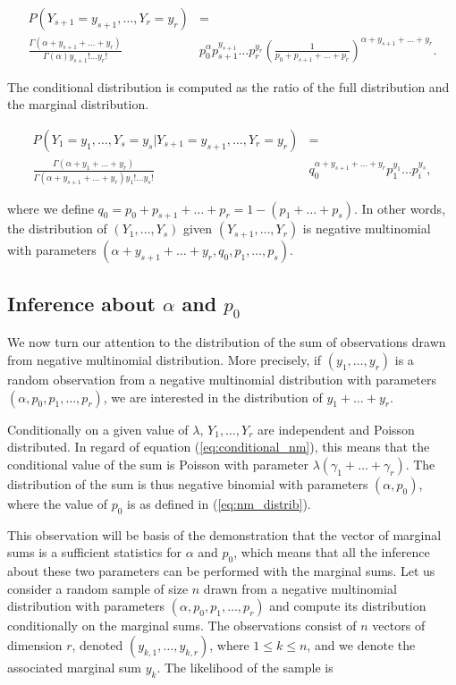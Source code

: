 \documentclass[12pt]{article}
\begin{document}
    \begin{align*}
    P(Y_{s+1}=y_{s+1}, \ldots, Y_r=y_r) &= \\
      \frac{\Gamma(\alpha + y_{s+1} + \ldots + y_r)}
      {\Gamma(\alpha)y_{s+1}! \ldots y_r!} &p_0^{\alpha}p_{s+1}^{y_{s+1}}
      \ldots p_r^{y_r} \left(\frac{1}{p_0 + p_{s+1} + \ldots + p_r}
      \right)^{\alpha+y_{s+1} + \ldots + y_r}.
    \end{align*}

    The conditional distribution is computed as the ratio of the
    full distribution and the marginal distribution.

    \begin{align*}
      P(Y_1=y_1, \ldots, Y_s=y_s|Y_{s+1}=y_{s+1}, \ldots, Y_r=y_r) &= \\
      \frac{\Gamma(\alpha + y_1 + \ldots + y_r)}
      {\Gamma(\alpha+y_{s+1}+\ldots+y_r)y_1! \ldots y_s!}
      &q_0^{\alpha+y_{s+1}+\ldots+y_r}p_1^{y_1} \ldots p_i^{y_s},
    \end{align*}

    \noindent
    where we define
    $q_0 = p_0+p_{s+1}+\ldots+p_r = 1-(p_1+\ldots+p_s)$.
    In other words, the distribution of $(Y_1, \ldots, Y_s)$ given
    $(Y_{s+1}, \ldots, Y_r)$ is negative multinomial with parameters
    $(\alpha+y_{s+1}+\ldots+y_r, q_0, p_1, \ldots, p_s)$.

\subsection{Inference about $\alpha$ and $p_0$}
\label{sec:inference_alpha}

    We now turn our attention to the distribution of the sum of
    observations drawn from negative multinomial distribution. More
    precisely, if $(y_1, \ldots, y_r)$ is a random observation
    from a negative multinomial distribution with parameters
    $(\alpha, p_0, p_1, \ldots, p_r)$, we are interested in the
    distribution of $y_1 + \ldots + y_r$.

    Conditionally on a given value of $\lambda$, $Y_1, \ldots, Y_r$
    are independent and Poisson distributed. In regard of equation
    (\ref{eq:conditional_nm}), this means that the conditional value
    of the sum is Poisson with parameter
    $\lambda(\gamma_1 + \ldots + \gamma_r)$. The distribution of the
    sum is thus negative binomial with parameters $(\alpha, p_0)$,
    where the value of $p_0$ is as defined in (\ref{eq:nm_distrib}).

    This observation will be basis of the demonstration that the
    vector of marginal sums is a sufficient statistics for $\alpha$
    and $p_0$, which means that all the inference about these two
    parameters can be performed with the marginal sums. Let us
    consider a random sample of size $n$ drawn from a negative
    multinomial distribution with parameters
    $(\alpha, p_0, p_1, \ldots, p_r)$ and compute its distribution
    conditionally on the marginal sums. The observations consist of
    $n$ vectors of dimension $r$, denoted $(y_{k,1}, \ldots, y_{k,r})$,
    where $1 \leq k \leq n$, and we denote the associated marginal
    sum $y_k$. The likelihood of the sample is
\end{document}

